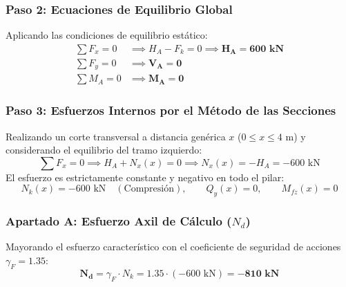 \subsubsection*{Paso 2: Ecuaciones de Equilibrio Global}
Aplicando las condiciones de equilibrio estático:
\begin{align}
    \sum F_x = 0 & \implies H_A - F_k = 0 \implies \mathbf{H_A = 600\text{ kN}} \\
    \sum F_y = 0 & \implies \mathbf{V_A = 0}                                    \\
    \sum M_A = 0 & \implies \mathbf{M_A = 0}
\end{align}

\subsubsection*{Paso 3: Esfuerzos Internos por el Método de las Secciones}
Realizando un corte transversal a distancia genérica $x$ ($0 \le x \le 4\text{ m}$) y considerando el equilibrio del tramo izquierdo:
\begin{equation}
    \sum F_x = 0 \implies H_A + N_x(x) = 0 \implies N_x(x) = -H_A = -600\text{ kN}
\end{equation}
El esfuerzo es estrictamente constante y negativo en todo el pilar:
\begin{equation}
    N_k(x) = -600\text{ kN} \quad (\text{Compresión}), \qquad Q_y(x) = 0, \qquad M_{fz}(x) = 0
\end{equation}

\subsubsection*{Apartado A: Esfuerzo Axil de Cálculo ($N_d$)}
Mayorando el esfuerzo característico con el coeficiente de seguridad de acciones $\gamma_F = 1.35$:
\begin{equation}
    \mathbf{N_d} = \gamma_F \cdot N_k = 1.35 \cdot (-600\text{ kN}) = \mathbf{-810\text{ kN}}
\end{equation}

